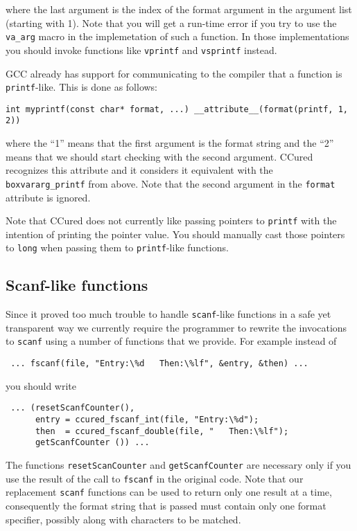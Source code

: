 \documentclass{book}
\def\t#1{{\tt #1}}
\begin{document}
 where the last argument is the index of the format argument in the argument
list (starting with 1). Note that you will get a run-time error if you try to
use the \t{va\_arg} macro in the implemetation of such a function. In those
implementations you should invoke functions like \t{vprintf} and \t{vsprintf}
instead.

 GCC already has support for communicating to the compiler that a function is
\t{printf}-like. This is done as follows:
\begin{verbatim}
int myprintf(const char* format, ...) __attribute__(format(printf, 1, 2))
\end{verbatim}
 
 where the ``1'' means that the first argument is the format string and the
``2'' means that we should start checking with the second argument. CCured
recognizes this attribute and it considers it equivalent with the
\t{boxvararg\_printf} from above. Note that the second argument in the
\t{format} attribute is ignored. 

 Note that CCured does not currently like passing pointers to \t{printf} with
the intention of printing the pointer value. You should manually cast those
pointers to \t{long} when passing them to \t{printf}-like functions.

    \subsection{Scanf-like functions}

 Since it proved too much trouble to handle \t{scanf}-like functions in a safe
yet transparent way we currently require the programmer to rewrite the
invocations to \t{scanf} using a number of functions that we provide. For
example instead of 
\begin{verbatim}
 ... fscanf(file, "Entry:\%d   Then:\%lf", &entry, &then) ...
\end{verbatim}

 you should write
\begin{verbatim}
 ... (resetScanfCounter(), 
      entry = ccured_fscanf_int(file, "Entry:\%d");
      then  = ccured_fscanf_double(file, "   Then:\%lf");
      getScanfCounter ()) ...
\end{verbatim}

 The functions \t{resetScanCounter} and \t{getScanfCounter} are necessary only
if you use the result of the call to \t{fscanf} in the original code. Note
that our replacement \t{scanf} functions can be used to return only one result
at a time, consequently the format string that is passed must contain only one
format specifier, possibly along with characters to be matched. 
\end{document}
